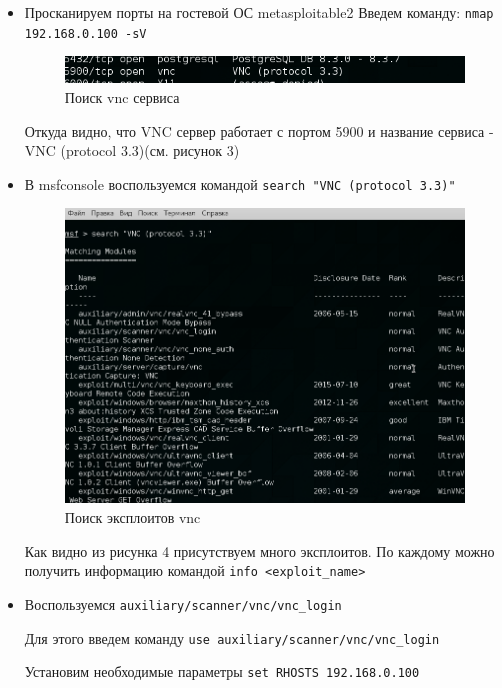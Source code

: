 \documentclass[11pt, a4paper]{article}		%
\begin{document}
\begin{itemize}
\item Просканируем порты на гостевой ОС metasploitable2
Введем команду: \verb'nmap 192.168.0.100 -sV'

\begin{figure}[h!]
\centering
\includegraphics[scale=0.8]{res/meta1}
\caption{Поиск vnc сервиса}
\end{figure}

Откуда видно, что VNC сервер работает с портом 5900 и название сервиса - VNC (protocol 3.3)(см. рисунок 3)

\item В msfconsole воспользуемся командой \verb'search "VNC (protocol 3.3)"'

\begin{figure}[h!]
\centering
\includegraphics[scale=0.8]{res/meta2}
\caption{Поиск эксплоитов vnc}
\end{figure}

Как видно из рисунка 4 присутствуем много эксплоитов. По каждому можно получить информацию командой \verb'info <exploit_name>' 

\item Воспользуемся \verb'auxiliary/scanner/vnc/vnc_login'

Для этого введем команду \verb'use auxiliary/scanner/vnc/vnc_login'

Установим необходимые параметры \verb'set RHOSTS 192.168.0.100'


\end{itemize}
\end{document}
